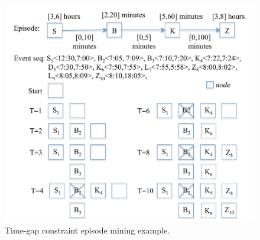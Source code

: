 \begin{figure}[!hbtp]
\centering
\includegraphics[width=1.0\textwidth]{adlfigs/MingExample.pdf}
\caption{Time-gap constraint episode mining example.\label{fig_MingExample}}
\end{figure}

